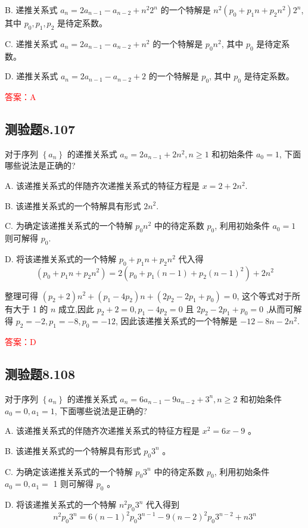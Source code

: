 \documentclass[UTF8, heading=true]{ctexart}
\begin{document}
B. 递推关系式 $a_n=2 a_{n-1}-a_{n-2}+n^2 2^n$ 的一个特解是 $n^2\left(p_0+p_1 n+p_2 n^2\right) 2^n$, 其中 $p_0, p_1, p_2$ 是待定系数。

C. 递推关系式 $a_n=2 a_{n-1}-a_{n-2}+n^2$ 的一个特解是 $p_0 n^2$, 其中 $p_0$ 是待定系数。

D. 递推关系式 $a_n=2 a_{n-1}-a_{n-2}+2$ 的一个特解是 $p_0$, 其中 $p_0$ 是待定系数。

\textcolor{red}{答案：A}

\subsection{测验题8.107}
对于序列 $\left\{a_n\right\}$ 的递推关系式 $a_n=2 a_{n-1}+2 n^2, n \geq 1$ 和初始条件 $a_0=1$, 下面哪些说法是正确的?

A. 该递推关系式的伴随齐次递推关系式的特征方程是 $x=2+2 n^2$.

B. 该递推关系式的一个特解具有形式 $2 n^2$.

C. 为确定该递推关系式的一个特解 $p_0 n^2$ 中的待定系数 $p_0$, 利用初始条件 $a_0=1$ 则可解得 $p_0$.

D. 将该递推关系式的一个特解 $p_0+p_1 n+p_2 n^2$ 代入得
$$
\left(p_0+p_1 n+p_2 n^2\right)=2\left(p_0+p_1(n-1)+p_2(n-1)^2\right)+2 n^2
$$

整理可得 $\left(p_2+2\right) n^2+\left(p_1-4 p_2\right) n+\left(2 p_2-2 p_1+p_0\right)=0$, 这个等式对于所有大于 1 的 $n$ 成立,因此 $p_2+2=0, p_1-4 p_2=0$ 且 $2 p_2-2 p_1+p_0=0$ ,从而可解得 $p_2=-2, p_1=-8, p_0=-12$, 因此该递推关系式的一个特解是 $-12-8 n-2 n^2$.


\textcolor{red}{答案：D}

\subsection{测验题8.108}

对于序列 $\left\{a_n\right\}$ 的递推关系式 $a_n=6 a_{n-1}-9 a_{n-2}+3^n, n \geq 2$ 和初始条件 $a_0=0, a_1=1$, 下面哪些说法是正确的?

A. 该递推关系式的伴随齐次递推关系式的特征方程是 $x^2=6 x-9$ 。

B. 该递推关系式的一个特解具有形式 $p_0 3^n$ 。

C. 为确定该递推关系式的一个特解 $p_0 3^n$ 中的待定系数 $p_0$, 利用初始条件 $a_0=0, a_1=$ 1 则可解得 $p_0$ 。

D. 将该递推关系式的一个特解 $n^2 p_0 3^n$ 代入得到
$$
n^2 p_0 3^n=6(n-1)^2 p_0 3^{n-1}-9(n-2)^2 p_0 3^{n-2}+n 3^n
$$
\end{document}
